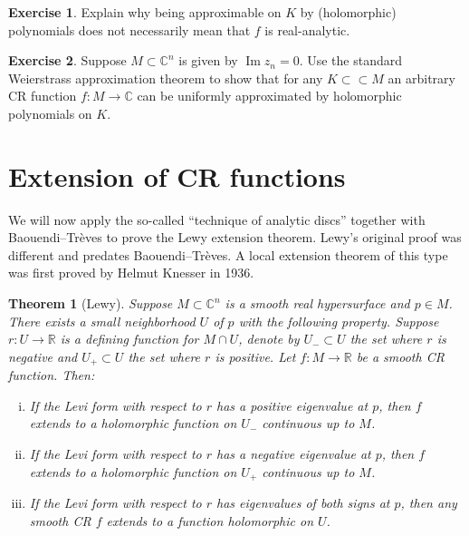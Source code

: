 \documentclass[12pt,openany]{book}
\renewcommand{\Im}{\operatorname{Im}}
\newcommand{\C}{{\mathbb{C}}}
\newcommand{\R}{{\mathbb{R}}}
\theoremstyle{plain}
\newtheorem{thm}{Theorem}[section]
\theoremstyle{remark}
\theoremstyle{definition}
\newenvironment{exbox}{%
    \def\FrameCommand{\vrule width 1pt \relax\hspace {10pt}}%
    \MakeFramed {\advance \hsize -\width \FrameRestore }%
}{%
    \endMakeFramed
}
\theoremstyle{exercise}
\newtheorem{exercise}{Exercise}[section]
\theoremstyle{example}
\begin{document}
\begin{exbox}
\begin{exercise}
Explain why being approximable on $K$ by (holomorphic) polynomials does not
necessarily mean that
$f$ is real-analytic.
\end{exercise}

\begin{exercise}
Suppose $M \subset \C^n$ is given by $\Im z_n = 0$.  Use the standard
Weierstrass approximation theorem to show that for any $K \subset \subset M$
an arbitrary CR function $f \colon M \to \C$ can be uniformly approximated
by holomorphic polynomials on $K$.
\end{exercise}
\end{exbox}


\section{Extension of CR functions}

We will now apply the so-called ``technique of analytic discs'' together
with
Baouendi--Tr{\`e}ves to prove the
Lewy extension theorem.  Lewy's original proof was different
and predates Baouendi--Tr{\`e}ves.  A local extension theorem of this type
was first proved by Helmut Knesser in 1936.

\begin{thm}[Lewy]%
Suppose $M \subset \C^n$ is a smooth real hypersurface and $p \in M$.
There exists a small neighborhood $U$ of $p$ with the following
property.
Suppose $r \colon U \to \R$ is
a defining function for $M \cap U$, denote by $U_- \subset U$ the set where $r$
is negative and $U_+ \subset U$ the set where $r$ is positive.
Let $f \colon M \to \R$ be a smooth CR function.
Then:

\begin{enumerate}[(i)]
\item
If the Levi form with respect to $r$ has a positive eigenvalue at $p$, then
$f$ extends to a holomorphic function on $U_-$ continuous up to $M$.
\item
If the Levi form with respect to $r$ has a negative eigenvalue at $p$, then
$f$ extends to a holomorphic function on $U_+$ continuous up to $M$.
\item
If the Levi form with respect to $r$ has eigenvalues of both signs at $p$, then any smooth
CR $f$ extends to
a function holomorphic on $U$.
\end{enumerate}
\end{thm}
\end{document}

